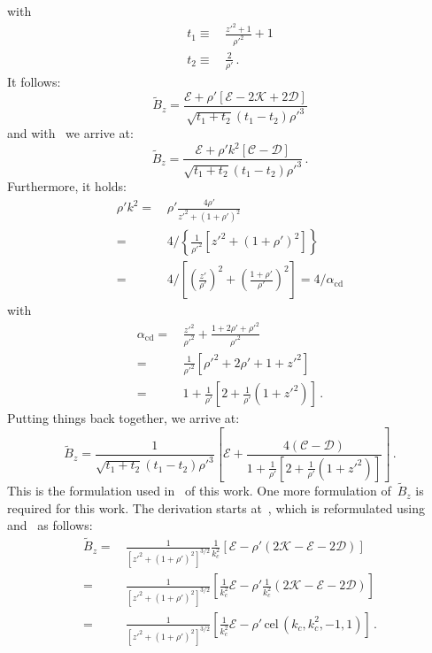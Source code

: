 with
\begin{align}
  t_1 \equiv&\, \frac{z'^2 + 1}{\rho'^2} + 1 \\
  t_2 \equiv&\, \frac{2}{\rho'} \, .
\end{align}
It follows:
\begin{equation}
  \tilde{B}_z
 = \frac{\mathcal{E} + \rho' \left[\mathcal{E} - 2 \mathcal{K} + 2 \mathcal{D} \right]}
        {\sqrt{t_1 + t_2} (t_1 - t_2) \rho'^3}
\end{equation}
and with~ we arrive at:
\begin{equation}
  \tilde{B}_z
 = \frac{\mathcal{E} + \rho' k^2 \left[\mathcal{C} - \mathcal{D} \right]}
        {\sqrt{t_1 + t_2} (t_1 - t_2) \rho'^3} \, .
\end{equation}
Furthermore, it holds:
\begin{align}
  \rho' k^2
 =&\, \rho' \frac{4 \rho'}{z'^2 + (1 + \rho')^2} \nonumber \\
 =&\, 4 / \left\{ \frac{1}{\rho'^2} \left[ z'^2 + (1 + \rho')^2 \right] \right\} \nonumber \\
 =&\, 4 / \left[ \left( \frac{z'}{\rho'} \right)^2 + \left( \frac{1 + \rho'}{\rho'} \right)^2 \right]
 = 4 / \alpha_\textrm{cd}
\end{align}
with
\begin{align}
  \alpha_\textrm{cd}
 =&\, \frac{z'^2}{\rho'^2} + \frac{1 + 2 \rho' + \rho'^2}{\rho'^2} \nonumber \\
 =&\, \frac{1}{\rho'^2} \left[ \rho'^2 + 2 \rho' + 1 + z'^2 \right] \nonumber \\
 =&\, 1 + \frac{1}{\rho'} \left[ 2 + \frac{1}{\rho'} \left( 1 + z'^2 \right) \right] \, .
\end{align}
Putting things back together, we arrive at:
\begin{equation}
  \tilde{B}_z
 = \frac{1}{\sqrt{t_1 + t_2} (t_1 - t_2) \rho'^3}
   \left[
     \mathcal{E} + \frac{4 \left(\mathcal{C} - \mathcal{D} \right)}{1 + \frac{1}{\rho'} \left[ 2 + \frac{1}{\rho'} \left( 1 + z'^2 \right) \right]}
   \right] \, .
\end{equation}
This is the formulation used in~ of this work.
One more formulation of~$\tilde{B}_z$ is required for this work.
The derivation starts at~, which is reformulated
using~ and~ as follows:
\begin{align}
 \tilde{B}_z
 =&\, \frac{1}{\left[z'^2 + (1 + \rho')^2\right]^{3/2}} \frac{1}{k_c^2}
      \left[ \mathcal{E} -\rho' \left( 2 \mathcal{K} - \mathcal{E} - 2 \mathcal{D} \right) \right] \nonumber \\
 =&\, \frac{1}{\left[z'^2 + (1 + \rho')^2\right]^{3/2}}
      \left[ \frac{1}{k_c^2} \mathcal{E} - \rho' \frac{1}{k_c^2} \left( 2 \mathcal{K} - \mathcal{E} - 2 \mathcal{D} \right) \right] \nonumber \\
 =&\, \frac{1}{\left[z'^2 + (1 + \rho')^2\right]^{3/2}}
      \left[ \frac{1}{k_c^2} \mathcal{E} - \rho' \,\textrm{cel}\,(k_c, k_c^2, -1, 1) \right] \, .
\end{align}
